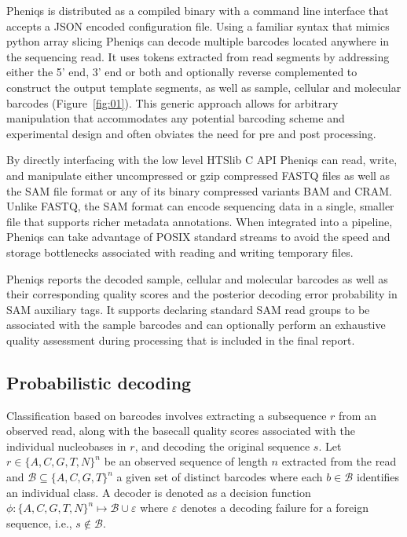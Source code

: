 \documentclass[10pt,twocolumn]{article}
\begin{document}
Pheniqs is distributed as a compiled binary with a command line interface that accepts a JSON encoded configuration file. Using a familiar syntax that mimics python array slicing Pheniqs can decode multiple barcodes located anywhere in the sequencing read. It uses tokens extracted from read segments by addressing either the 5’ end, 3’ end or both and optionally reverse complemented to construct the output template segments, as well as sample, cellular and molecular barcodes (Figure~\ref{fig:01}). This generic approach allows for arbitrary manipulation that accommodates any potential barcoding scheme and experimental design and often obviates the need for pre and post processing.

By directly interfacing with the low level HTSlib C API Pheniqs can read, write, and manipulate either uncompressed or gzip compressed FASTQ files as well as the SAM file format or any of its binary compressed variants BAM and CRAM. Unlike FASTQ, the SAM format can encode sequencing data in a single, smaller file that supports richer metadata annotations. When integrated into a pipeline, Pheniqs can take advantage of POSIX standard streams to avoid the speed and storage bottlenecks associated with reading and writing temporary files.

Pheniqs reports the decoded sample, cellular and molecular barcodes as well as their corresponding quality scores and the posterior decoding error probability in SAM auxiliary tags. It supports declaring standard SAM read groups to be associated with the sample barcodes and can optionally perform an exhaustive quality assessment during processing that is included in the final report.

\subsection*{Probabilistic decoding}

Classification based on barcodes involves extracting a subsequence $r$ from an observed read, along with the basecall quality scores associated with the individual nucleobases in $r$, and decoding the original sequence $s$. Let $r \in \{A,C,G,T,N\}^n$ be an observed sequence of length $n$ extracted from the read and $\mathcal{B} \subseteq \{A,C,G,T\}^n$ a given set of distinct barcodes where each $b \in \mathcal{B}$ identifies an individual class. A decoder is denoted as a decision function $\phi: \{A,C,G,T,N\}^n \mapsto \mathcal{B} \cup \varepsilon$ where $\varepsilon$ denotes a decoding failure for a foreign sequence, i.e., $s \notin \mathcal{B}$.
\end{document}
